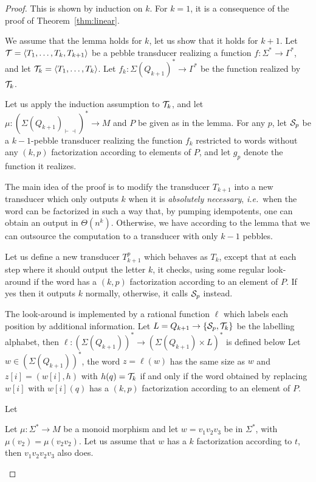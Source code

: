 \begin{proof}
    This is shown by induction on $k$.
    For $k=1$, it is a consequence of the proof of Theorem~\ref{thm:linear}.

    We assume that the lemma holds for $k$, let us show that it holds for $k+1$.
    Let ${\mathcal T}=\langle T_1,\ldots,T_k,T_{k+1} \rangle$ be a pebble transducer realizing a function $f:\Sigma^*\rightarrow\Gamma^*$, and let ${\mathcal T}_k=\langle T_1,\ldots,T_k \rangle$. Let $f_k:\Sigma(Q_{k+1})^*\rightarrow \Gamma^*$ be the function realized by ${\mathcal T}_k$.

    Let us apply the induction assumption to ${\mathcal T}_k$, and let $\mu:(\Sigma(Q_{k+1})_{\vdash\dashv})^*\rightarrow M$ and $P$ be given as in the lemma. For any $p$, let ${\mathcal S}_p$ be a $k{-}1$-pebble transducer realizing the function $f_k$ restricted to words without any $(k,p)$ factorization according to elements of $P$, and let $g_p$ denote the function it realizes.

    The main idea of the proof is to modify the transducer $T_{k+1}$ into a new transducer which only outputs $k$ when it is \emph{absolutely necessary}, \textit{i.e.}~when the word can be factorized in such a way that, by pumping idempotents, one can obtain an output in $\Theta(n^k)$.
    Otherwise, we have according to the lemma that we can outsource the computation to a transducer with only $k-1$ pebbles.

    Let us define a new transducer $T_{k+1}^p$ which behaves as $T_k$, except that at each step where it should output the letter $k$, it checks, using some regular look-around if the word has a $(k,p)$ factorization according to an element of $P$. If yes then it outputs $k$ normally, otherwise, it calls ${\mathcal S}_p$ instead.

    The look-around is implemented by a rational function $\ell$ which labels each position by additional information.
    Let $L=Q_{k+1}\rightarrow \{{\mathcal S}_p,{\mathcal T}_k\}$ be the labelling alphabet, then $\ell:(\Sigma(Q_{k+1}))^*\rightarrow (\Sigma(Q_{k+1})\times L)^*$ is defined below
    Let $w\in (\Sigma(Q_{k+1}))^*$, the word $z=\ell(w)$ has the same size as $w$ and $z[i]=(w[i],h)$ with $h(q)={\mathcal T}_k$ if and only if the word obtained by replacing $w[i]$ with $w[i](q)$ has a $(k,p)$ factorization according to an element of $P$.

    Let
    \begin{claim}
        Let $\mu:\Sigma^*\rightarrow M$ be a monoid morphism and let $w=v_1v_2v_3$ be in $ \Sigma^*$, with $\mu(v_2)=\mu(v_2v_2)$.
        Let us assume that $w$ has a $k$ factorization according to $t$, then $v_1v_2v_2v_3$ also does.
    \end{claim}
\end{proof}

